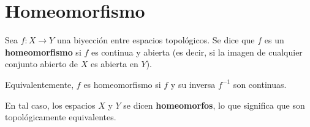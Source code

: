 \documentclass[12pt]{article}
\begin{document}
\section*{Homeomorfismo}
\begin{tcolorbox}[definitionstyle]
Sea \( f : X \to Y \) una biyección entre espacios topológicos.  
Se dice que \( f \) es un \textbf{homeomorfismo} si \( f \) es continua y abierta  
(es decir, si la imagen de cualquier conjunto abierto de \( X \) es abierta en \( Y \)).

Equivalentemente, \( f \) es homeomorfismo si \( f \) y su inversa \( f^{-1} \) son continuas.

En tal caso, los espacios \( X \) y \( Y \) se dicen \textbf{homeomorfos},  
lo que significa que son topológicamente equivalentes.
\end{tcolorbox}
\end{document}
